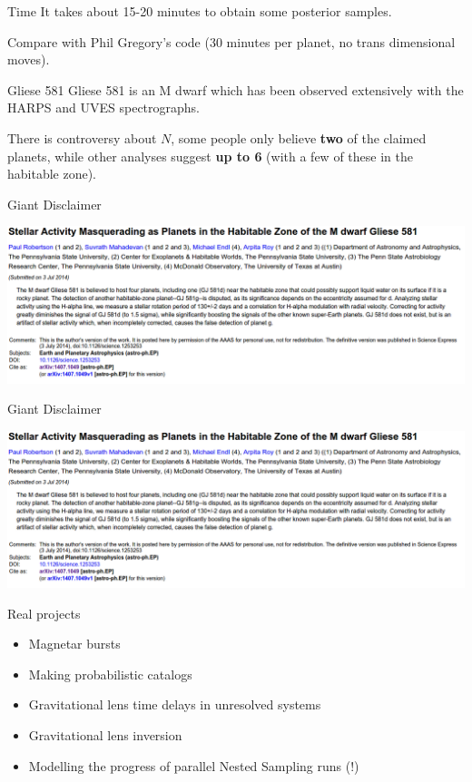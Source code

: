 \begin{frame}[t]{Time}
It takes about 15-20 minutes to obtain some posterior samples.

Compare with Phil Gregory's code (30 minutes per planet, no trans dimensional
moves).
\end{frame}

\begin{frame}[t]{Gliese 581}
Gliese 581 is an M dwarf which has been observed extensively with the HARPS
and UVES spectrographs.

\vspace{20pt}

There is controversy about $N$, some people only
believe {\bf two} of the claimed planets, while other analyses suggest
{\bf up to 6} (with a few of these in the habitable zone).
\end{frame}

\begin{frame}[t]{Giant Disclaimer}
\begin{center}
\includegraphics[scale=0.25]{robertson.png}
\end{center}
\end{frame}

\begin{frame}[t]{Giant Disclaimer}
\begin{center}
\includegraphics[scale=0.25]{robertson.png}
\end{center}
\end{frame}



\begin{frame}[t]{Real projects}
\begin{itemize}
\item Magnetar bursts
\item Making probabilistic catalogs
\item Gravitational lens time delays in unresolved systems
\item Gravitational lens inversion
\item Modelling the progress of parallel Nested Sampling runs (!)
\end{itemize}
\end{frame}

